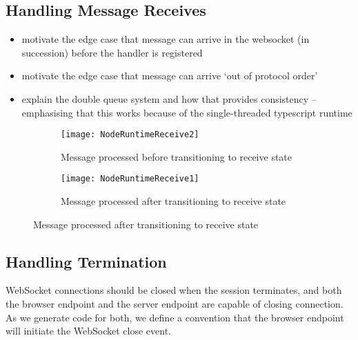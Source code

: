 \subsection{Handling Message Receives}
\begin{itemize}
\item motivate the edge case that message can arrive in the websocket (in succession) before the handler is registered
\item motivate the edge case that message can arrive `out of protocol order' 
\item explain the double queue system and how that provides consistency -- emphasising that this works because of the single-threaded typescript runtime
\end{itemize}

\begin{figure}[!ht]
\centering
\begin{subfigure}[b]{0.8\textwidth}
\centering
\texttt{[image: NodeRuntimeReceive2]}
\caption{Message processed before transitioning to receive state}
\label{subfig:nodereceivemsgfirst}
\end{subfigure}
\hfill
\begin{subfigure}[b]{0.8\textwidth}
\centering
\texttt{[image: NodeRuntimeReceive1]}
\caption{Message processed after transitioning to receive state}
\label{subfig:nodereceivehandlefirst}
\end{subfigure}
\label{fig:nodereceivecompare}
\end{figure}

\subsection{Handling Termination}
WebSocket connections should be closed when the session terminates,
and both the browser endpoint and the server endpoint are capable
of closing connection. As we generate code for both, we define
a convention that the browser endpoint will initiate the WebSocket
close event.